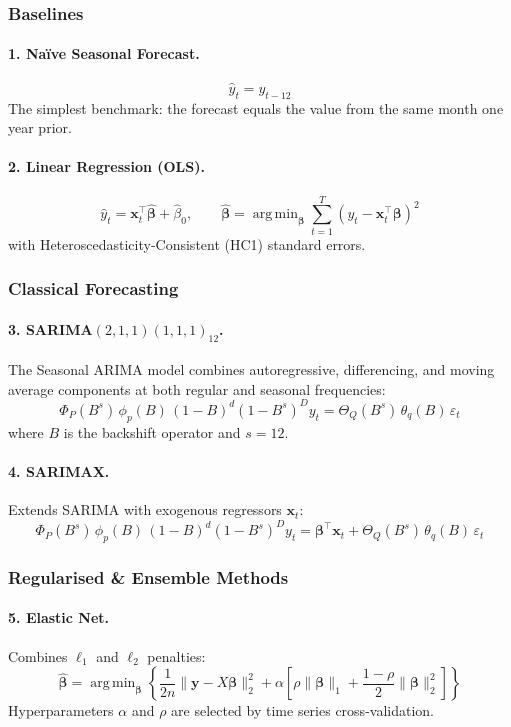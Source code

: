 \documentclass[12pt,a4paper]{article}
\newcommand{\bx}{\mathbf{x}}
\newcommand{\by}{\mathbf{y}}
\DeclareMathOperator*{\argmin}{arg\,min}
\begin{document}
\begin{table}[H]
\subsubsection{Baselines}

\paragraph{1. Naïve Seasonal Forecast.}
$$\hat{y}_t = y_{t-12}$$
The simplest benchmark: the forecast equals the value from the same
month one year prior.

\paragraph{2. Linear Regression (OLS).}
$$\hat{y}_t = \bx_t^\top \hat{\boldsymbol{\beta}} + \hat{\beta}_0, \qquad
  \hat{\boldsymbol{\beta}} = \argmin_{\boldsymbol{\beta}}
  \sum_{t=1}^{T} (y_t - \bx_t^\top \boldsymbol{\beta})^2$$
with Heteroscedasticity-Consistent (HC1) standard errors.

\subsubsection{Classical Forecasting}

\paragraph{3. SARIMA$(2,1,1)(1,1,1)_{12}$.}
The Seasonal ARIMA model combines autoregressive, differencing, and
moving average components at both regular and seasonal frequencies:
$$\Phi_P(B^s)\,\phi_p(B)\,(1-B)^d(1-B^s)^D y_t
  = \Theta_Q(B^s)\,\theta_q(B)\,\varepsilon_t$$
where $B$ is the backshift operator and $s=12$.

\paragraph{4. SARIMAX.}
Extends SARIMA with exogenous regressors $\bx_t$:
$$\Phi_P(B^s)\,\phi_p(B)\,(1-B)^d(1-B^s)^D y_t
  = \boldsymbol{\beta}^\top \bx_t + \Theta_Q(B^s)\,\theta_q(B)\,\varepsilon_t$$

\subsubsection{Regularised \& Ensemble Methods}

\paragraph{5. Elastic Net.}
Combines $\ell_1$ and $\ell_2$ penalties:
$$\hat{\boldsymbol{\beta}} = \argmin_{\boldsymbol{\beta}}
  \left\{ \frac{1}{2n}\|\by - X\boldsymbol{\beta}\|_2^2
  + \alpha\left[\rho\|\boldsymbol{\beta}\|_1
  + \frac{1-\rho}{2}\|\boldsymbol{\beta}\|_2^2\right] \right\}$$
Hyperparameters $\alpha$ and $\rho$ are selected by time series
cross-validation.


\end{table}
\end{document}
